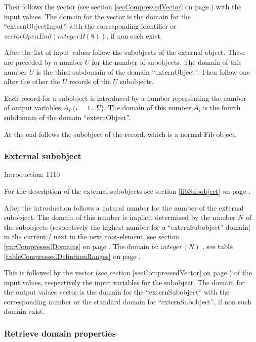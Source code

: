 Then follows the vector (see section \ref{secCompressedVector} on page \pageref{secCompressedVector}) with the input values. 
The domain for the vector is the domain for the ``externObjectInput'' with the corresponding identifier or $vectorOpenEnd( integerB(8) )$, if non such exist.

After the list of input values follow the subobjects of the external object. These are preceded by a number $U$ for the number of subobjects. The domain of this number $U$ is the third subdomain of the domain ``externObject''. Then follow one after the other the $U$ records of the $U$ subobjects.

Each record for a subobject is introduced by a number representing the number of output variables $A_i$ ($i = 1 \ldots U$). The domain of this number $A_i$ is the fourth subdomain of the domain ``externObject''.

At the end follows the subobject of the record, which is a normal Fib object.


\subsubsection{External subobject}
\label{secCompressedExternSubobjects}

Introduction: 1110

\bigskip\noindent
For the description of the external subobjects see section \ref{fibSubobject} on page \pageref{fibSubobject} .

After the introduction follows a natural number for the number of the external subobject. The domain of this number is implicit determined by the number $N$ of the subobjects (respectively the highest number for a ``externSubobject'' domain) in the current / next in the next root-element, see section \ref{parCompressedDomains} on page \pageref{parCompressedDomains} . The domain is: $integer(N)$ , see table \ref{tableCompressedDefinitionRanges} on page \pageref{tableCompressedDefinitionRanges} .


This is followed by the vector (see section \ref{secCompressedVector} on page \pageref{secCompressedVector}) of the input values, respectively the input variables for the subobject. The domain for the output values vector is the domain for the ``externSubobject'' with the corresponding number or the standard domain for ``externSubobject'', if non such domain exist.



\subsubsection{Retrieve domain properties}

